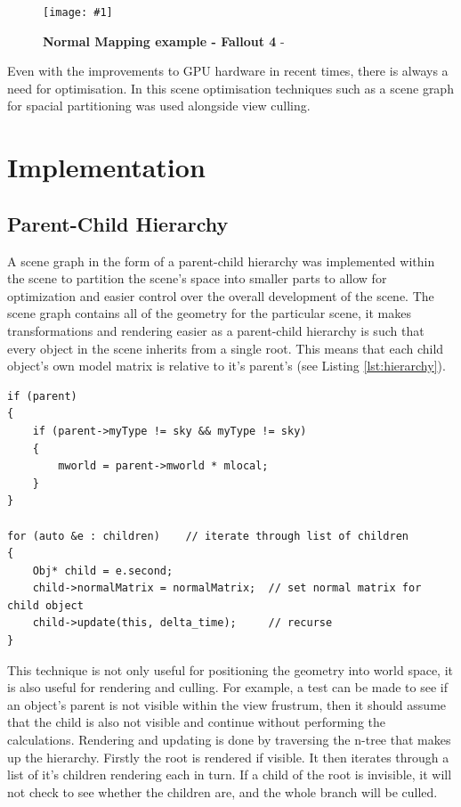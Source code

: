\documentclass[conference]{acmsiggraph}
\newcommand{\figuremacroW}[4]{
\begin{figure}[h] %
	\centering
	\texttt{[image: \#1]}
	\caption[#2]{\textbf{#2} - #3}
	\label{fig:#1}
\end{figure}
}
\begin{document}
\figuremacroW
{fallout}
{Normal Mapping example - Fallout 4}
{\protect\cite{Fallout4}}
{1.0}
	
Even with the improvements to GPU hardware in recent times, there is always a need for optimisation. In this scene optimisation techniques such as a scene graph for spacial partitioning was used alongside view culling.
	
\section{Implementation}

\subsection{Parent-Child Hierarchy}
	
A scene graph in the form of a parent-child hierarchy was implemented within the scene to partition the scene's space into smaller parts to allow for optimization and easier control over the overall development of the scene. The scene graph contains all of the geometry for the particular scene, it makes transformations and rendering easier as a parent-child hierarchy is such that every object in the scene inherits from a single root. This means that each child object's own model matrix is relative to it's parent's (see Listing \ref{lst:hierarchy}).
	
\begin{lstlisting}[label = {lst:hierarchy}, caption={Parent-child Hierarchy Update Method}]
if (parent)
{
	if (parent->myType != sky && myType != sky)
	{
		mworld = parent->mworld * mlocal;
	}
}
	
for (auto &e : children)    // iterate through list of children
{
	Obj* child = e.second;
	child->normalMatrix = normalMatrix;  // set normal matrix for child object 
	child->update(this, delta_time);     // recurse
}
\end{lstlisting}
	
This technique is not only useful for positioning the geometry into world space, it is also useful for rendering and culling. For example, a test can be made to see if an object's parent is not visible within the view frustrum, then it should assume that the child is also not visible and continue without performing the calculations.
Rendering and updating is done by traversing the n-tree that makes up the hierarchy. Firstly the root is rendered if visible. It then iterates through a list of it's children rendering each in turn. If a child of the root is invisible, it will not check to see whether the children are, and the whole branch will be culled. 
	
\end{document}
